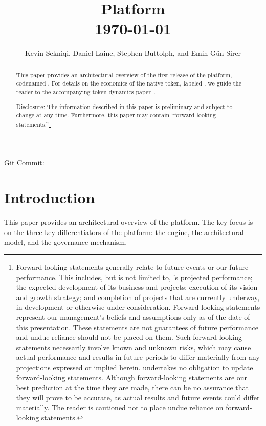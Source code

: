 \documentclass[runningheads]{llncs}
\begin{document}
\immediate{}

\title{\AVAPlatformName{} Platform\\\today}
\author{Kevin Sekniqi, Daniel Laine, Stephen Buttolph, and Emin G{\"u}n Sirer}
\institute{}

\maketitle

\begin{abstract}
This paper provides an architectural overview of the first release of the \AVAPlatformName{} platform, codenamed \AVAPlatformNameFirstRelease{}. For details on the economics of the native token, labeled \AVATokenName{}, we guide the reader to the accompanying token dynamics paper~\cite{avatokenpaper}.

\underline{Disclosure:} The information described in this paper is preliminary and subject to change at any time. Furthermore, this paper may contain “forward-looking statements.”\footnote{Forward-looking statements generally relate to future events or our future performance. This includes, but is not limited to, \AVAPlatformName{}'s projected performance; the expected development of its business and projects; execution of its vision and growth strategy; and completion of projects that are currently underway, in development or otherwise under consideration. Forward-looking statements represent our management’s beliefs and assumptions only as of the date of this presentation.
These statements are not guarantees of future performance and undue reliance should not be placed on them. Such forward-looking statements necessarily involve known and unknown risks, which may cause actual performance and results in future periods to differ materially from any projections expressed or implied herein. \AVAPlatformName{} undertakes no obligation to update forward-looking statements.
Although forward-looking statements are our best prediction at the time they are made, there can be no assurance that they will prove to be accurate, as actual results and future events could differ materially. The reader is cautioned not to place undue reliance on forward-looking statements.}

\end{abstract}
\begin{center} 
    \scriptsize Git Commit: 
 \end{center}
\section{Introduction}
\label{section:introduction}
This paper provides an architectural overview of the \AVAPlatformName{} platform. The key focus is on the three key differentiators of the platform: the engine, the architectural model, and the governance mechanism. 
\end{document}
